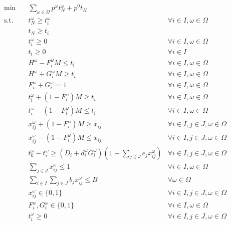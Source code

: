 \documentclass[11pt]{article}
\begin{document}
	\begin{subequations} \label{prob:extensive}
		\begin{align}
			\min \quad & \sum_{\omega \in \Omega} p^\omega t_N^\omega + p^0 t_N& \\
			\text{s.t.} \quad & t_N^\omega \geq t_i^\omega & \forall i \in I, \omega \in \Omega \\
			& t_N \geq t_i & \\
			& t_i^\omega \geq 0 & \forall i \in I, \omega \in \Omega\\
			& t_i \geq 0 & \forall i \in I\\
			& H^\omega - F_i^\omega M \leq t_i & \forall i \in I, \omega \in \Omega \label{cons:f}\\
			& H^\omega + G_i^\omega M \geq t_i & \forall i \in I, \omega \in \Omega \label{cons:g}\\
			& F_i^\omega + G_i^\omega = 1 & \forall i \in I, \omega \in \Omega \label{cons:fg}\\
			& t_i^\omega + (1 - F_i^\omega)M \geq t_i & \forall i \in I, \omega \in \Omega \label{cons:tf1}\\
			& t_i^\omega - (1 - F_i^\omega)M \leq t_i & \forall i \in I, \omega \in \Omega \label{cons:tf2}\\
			& x_{ij}^\omega + (1 - F_i^\omega)M \geq x_{ij} & \forall i \in I, j \in J, \omega \in \Omega \label{cons:xf1}\\
			& x_{ij}^\omega - (1 - F_i^\omega)M \leq x_{ij} & \forall i \in I, j \in J, \omega \in \Omega \label{cons:xf2}\\
			& t_k^\omega - t_i^\omega \geq (D_i + d_i^\omega G_i^\omega)(1 - \sum_{j \in J} e_jx_{ij}^\omega) & \forall i \in I, j \in J, \omega \in \Omega \label{cons:duration}\\
			& \sum_{j \in J} x_{ij}^\omega \leq 1 & \forall i \in I, \omega \in \Omega \label{cons:crashLim}\\
			& \sum_{i \in I}\sum_{j \in J} b_jx_{ij}^\omega \leq B & \forall \omega \in \Omega \label{cons:budget}\\
			& x_{ij}^\omega \in \{0,1\} & \forall i \in I, j \in J, \omega \in \Omega\\
			& F_i^\omega, G_i^\omega \in \{0,1\} & \forall i \in I, \omega \in \Omega\\
			& t_{i}^\omega \geq 0 & \forall i \in I, j \in J, \omega \in \Omega
		\end{align}
	\end{subequations}
	
\end{document}
